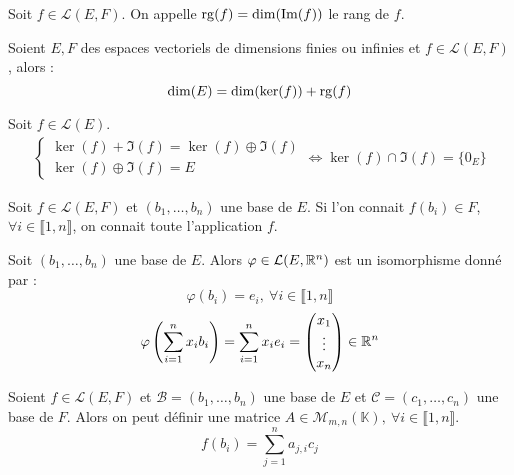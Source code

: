 \begin{definition}
    Soit $f \in \mathcal{L}(E, F)$. On appelle $\operatorname{rg}(f) = \dim(\Im(f))$ le rang de $f$.
\end{definition}

\begin{theorem}
    Soient $E, F$ des espaces vectoriels de dimensions finies ou infinies et $f \in \mathcal{L}(E, F)$, alors :
    \[ \dim(E) = \dim(\ker(f)) + \operatorname{rg}(f) \]
\end{theorem}

\begin{corollary}
    Soit $f \in \mathcal{L}(E)$.
    \begin{align*}
        \begin{cases}
            \ker(f) + \Im(f) = \ker(f) \oplus \Im(f) \\
            \ker(f) \oplus \Im(f) = E
        \end{cases}
        \iff 
        \ker(f) \cap \Im(f) = \{0_E\}
    \end{align*}
\end{corollary}

\begin{proposition}
    Soit $f \in \mathcal{L}(E, F)$ et $(b_1, \ldots, b_n)$ une base de $E$. Si l'on connait $f(b_i) \in F$, $\forall i \in \llbracket 1, n \rrbracket$, on connait toute l'application $f$.
\end{proposition}

\begin{corollary}
    Soit $(b_1, \ldots, b_n)$ une base de $E$. Alors $\varphi \in \mathcal{L}(E, \mathbb{R}^n)$ est un isomorphisme donné par :
    \[ \varphi(b_i) = e_i,\ \forall i \in \llbracket 1, n \rrbracket \]
    \[ \varphi \left( \sum_{i = 1}^{n} x_i b_i \right) = \sum_{i = 1}^{n} x_i e_i = 
    \begin{pmatrix}
        x_1 \\
        \vdots \\
        x_n
    \end{pmatrix}
    \in \mathbb{R}^n
     \]
\end{corollary}

\begin{definition}
    Soient $f \in \mathcal{L}(E, F)$ et $\mathcal{B} = (b_1, \ldots, b_n)$ une base de $E$ et $\mathcal{C} = (c_1, \ldots, c_n)$ une base de $F$.
    Alors on peut définir une matrice $A \in \mathcal{M}_{m,n}(\mathbb{K}),\ \forall i \in \llbracket 1, n \rrbracket$. 
    \[ f(b_i) = \sum_{j = 1}^{n} a_{j,i} c_j \]
\end{definition}

